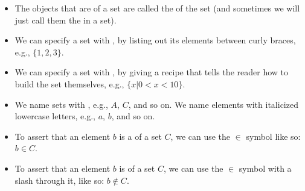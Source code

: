 \documentclass[../../../main.tex]{subfiles}
\begin{document}
\begin{itemize}

  \item The objects that are  of a set are called the  of the set (and sometimes we will just call them the  in a set).

  \item We can specify a set with , by listing out its elements between curly braces, e.g., $\{ 1, 2, 3 \}$.
  
  \item We can specify a set with , by giving a recipe that tells the reader how to build the set themselves, e.g., $\{ x | 0 < x < 10 \}$. 
  
  \item We name sets with , e.g., $A$, $C$, and so on. We name elements with italicized lowercase letters, e.g., $a$, $b$, and so on.
  
  \item To assert that an element $b$ is a  of a set $C$, we can use the $\in$ symbol like so: $b \in C$.
  
  \item To assert that an element $b$ is  of a set $C$, we can use the $\in$ symbol with a slash through it, like so: $b \not \in C$.

\end{itemize}
\end{document}
